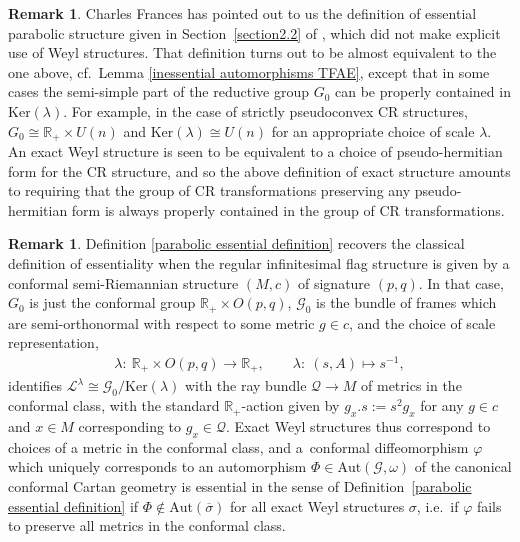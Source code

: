 \documentclass[11pt]{article}
\def\R{\mathbb{R}}
\def\Gbdle{\mathcal{G}}
\def\isom{\cong}
\theoremstyle{plain}
\theoremstyle{definition}
\newtheorem{Remark}[Definition]{Remark}
\begin{document}
\begin{Remark} Charles Frances has pointed out to us the def\/inition of essential parabolic structure given in Section~\ref{section2.2} of \cite{FrEss}, which did not make explicit use of Weyl structures. That def\/inition turns out to be almost equivalent to the one above, cf.\ Lemma \ref{inessential automorphisms TFAE}, except that in some cases the semi-simple part of the reductive group $G_0$ can be properly contained in $\mathrm{Ker}(\lambda)$. For example, in the case of strictly pseudoconvex CR structures, $G_0 \isom \R_+ \times U(n)$ and $\mathrm{Ker}(\lambda) \isom U(n)$ for an appropriate choice of scale $\lambda$. An exact Weyl structure is seen to be equivalent to a choice of pseudo-hermitian form for the CR structure, and so the above def\/inition of exact structure amounts to requiring that the group of CR transformations preserving any pseudo-hermitian form is always properly contained in the group of CR transformations.
\end{Remark}

\begin{Remark} Def\/inition \ref{parabolic essential definition} recovers the classical def\/inition of essentiality when the regular inf\/initesimal f\/lag structure is given by a conformal semi-Riemannian structure $(M,c)$ of signature $(p,q)$. In that case, $G_0$ is just the conformal group $\R_+ \times O(p,q)$, $\Gbdle_0$ is the bundle of frames which are semi-orthonormal with respect to some metric $g \in c$, and the choice of scale representation,
\begin{gather*}
 \lambda: \ \R_+ \times O(p,q) \rightarrow \R_+, \qquad
 \lambda: \ (s,A) \mapsto s^{-1},
\end{gather*}
identif\/ies $\mathcal{L}^{\lambda} \isom \Gbdle_0/\mathrm{Ker}(\lambda)$ with the ray bundle $\mathcal{Q} \rightarrow M$ of metrics in the conformal class, with the standard $\R_+$-action given by $g_x.s := s^2g_x$ for any $g \in c$ and $x \in M$ corresponding to $g_x \in \mathcal{Q}$. Exact Weyl structures thus correspond to choices of a metric in the conformal class, and a~conformal dif\/feomorphism $\varphi$ which uniquely corresponds to an automorphism $\Phi \in \mathrm{Aut}(\Gbdle,\omega)$ of the canonical conformal Cartan geometry is essential in the sense of Def\/inition~\ref{parabolic essential definition} if $\Phi \notin \mathrm{Aut}(\overline{\sigma})$ for all exact Weyl structures $\sigma$, i.e.\ if $\varphi$ fails to preserve all metrics in the conformal class.
\end{Remark}
\end{document}
